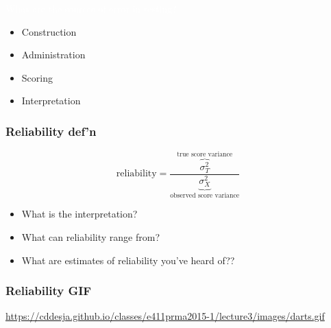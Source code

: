 \documentclass[dvipsnames]{beamer}\usepackage[]{graphicx}\usepackage[]{color}
\begin{document}
{
\begin{frame}
\centering
\Huge \textcolor{white}{What are the sources of error in testing?}
\end{frame}
}

\begin{frame}
\begin{itemize}
  \item Construction
  \item Administration
  \item Scoring
  \item Interpretation
\end{itemize}
\end{frame}

\begin{frame}
\frametitle{Reliability def'n}
$$\text{reliability} = \frac{\overbrace{\sigma^2_T}^{\text{true score variance}}}{\underbrace{\sigma^2_X}_{\text{observed score variance}}}$$

\begin{itemize}
  \item What is the interpretation?
  \item What can reliability range from?
  \item What are estimates of reliability you've heard of??
\end{itemize}
\end{frame}

\begin{frame}
\frametitle{Reliability GIF}
  \url{https://cddesja.github.io/classes/e411prma2015-1/lecture3/images/darts.gif}\footnotemark

\end{frame}
\end{document}
